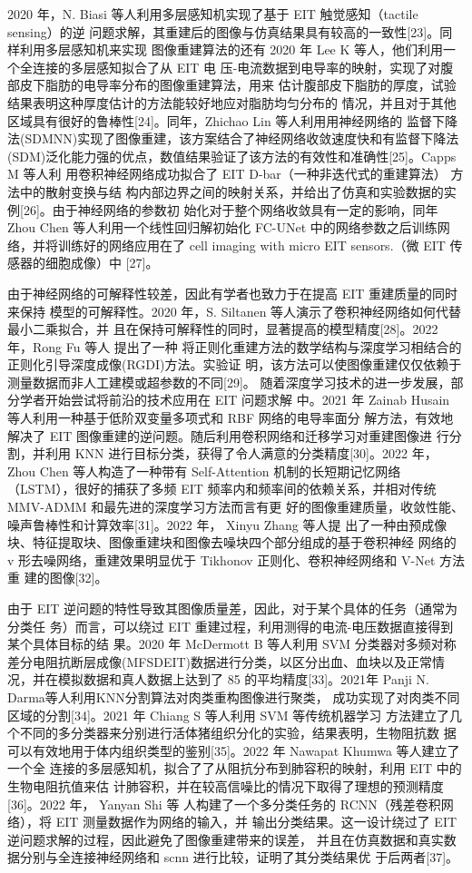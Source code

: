 2020 年，N. Biasi 等人利用多层感知机实现了基于 EIT 触觉感知（tactile sensing）的逆
问题求解，其重建后的图像与仿真结果具有较高的一致性[23]。同样利用多层感知机来实现
图像重建算法的还有 2020 年 Lee K 等人，他们利用一个全连接的多层感知拟合了从 EIT 电
压-电流数据到电导率的映射，实现了对腹部皮下脂肪的电导率分布的图像重建算法，用来
估计腹部皮下脂肪的厚度，试验结果表明这种厚度估计的方法能较好地应对脂肪均匀分布的
情况，并且对于其他区域具有很好的鲁棒性[24]。同年，Zhichao Lin 等人利用用神经网络的
监督下降法(SDMNN)实现了图像重建，该方案结合了神经网络收敛速度快和有监督下降法
(SDM)泛化能力强的优点，数值结果验证了该方法的有效性和准确性[25]。Capps M 等人利
用卷积神经网络成功拟合了 EIT D-bar（一种非迭代式的重建算法） 方法中的散射变换与结
构内部边界之间的映射关系，并给出了仿真和实验数据的实例[26]。由于神经网络的参数初
始化对于整个网络收敛具有一定的影响，同年 Zhou Chen 等人利用一个线性回归解初始化
FC-UNet 中的网络参数之后训练网络，并将训练好的网络应用在了 cell imaging with micro
EIT sensors.（微 EIT 传感器的细胞成像）中 [27]。

由于神经网络的可解释性较差，因此有学者也致力于在提高 EIT 重建质量的同时来保持
模型的可解释性。2020 年，S. Siltanen 等人演示了卷积神经网络如何代替最小二乘拟合，并
且在保持可解释性的同时，显著提高的模型精度[28]。2022 年，Rong Fu 等人 提出了一种
将正则化重建方法的数学结构与深度学习相结合的正则化引导深度成像(RGDI)方法。实验证
明，该方法可以使图像重建仅仅依赖于测量数据而非人工建模或超参数的不同[29]。
随着深度学习技术的进一步发展，部分学者开始尝试将前沿的技术应用在 EIT 问题求解
中。2021 年 Zainab Husain 等人利用一种基于低阶双变量多项式和 RBF 网络的电导率面分
解方法，有效地解决了 EIT 图像重建的逆问题。随后利用卷积网络和迁移学习对重建图像进
行分割，并利用 KNN 进行目标分类，获得了令人满意的分类精度[30]。2022 年，Zhou Chen
等人构造了一种带有 Self-Attention 机制的长短期记忆网络（LSTM），很好的捕获了多频 EIT
频率内和频率间的依赖关系，并相对传统 MMV-ADMM 和最先进的深度学习方法而言有更
好的图像重建质量，收敛性能、噪声鲁棒性和计算效率[31]。2022 年， Xinyu Zhang 等人提
出了一种由预成像块、特征提取块、图像重建块和图像去噪块四个部分组成的基于卷积神经
网络的 v 形去噪网络，重建效果明显优于 Tikhonov 正则化、卷积神经网络和 V-Net 方法重
建的图像[32]。

由于 EIT 逆问题的特性导致其图像质量差，因此，对于某个具体的任务（通常为分类任
务）而言，可以绕过 EIT 重建过程，利用测得的电流-电压数据直接得到某个具体目标的结
果。2020 年 McDermott B 等人利用 SVM 分类器对多频对称差分电阻抗断层成像(MFSDEIT)数据进行分类，以区分出血、血块以及正常情况，并在模拟数据和真人数据上达到了 85%
的平均精度[33]。2021年 Panji N. Darma等人利用KNN分割算法对肉类重构图像进行聚类，
成功实现了对肉类不同区域的分割[34]。2021 年 Chiang S 等人利用 SVM 等传统机器学习
方法建立了几个不同的多分类器来分别进行活体猪组织分化的实验，结果表明，生物阻抗数
据可以有效地用于体内组织类型的鉴别[35]。2022 年 Nawapat Khumwa 等人建立了一个全
连接的多层感知机，拟合了了从阻抗分布到肺容积的映射，利用 EIT 中的生物电阻抗值来估
计肺容积，并在较高信噪比的情况下取得了理想的预测精度[36]。2022 年， Yanyan Shi 等
人构建了一个多分类任务的 RCNN（残差卷积网络），将 EIT 测量数据作为网络的输入，并
输出分类结果。这一设计绕过了 EIT 逆问题求解的过程，因此避免了图像重建带来的误差，
并且在仿真数据和真实数据分别与全连接神经网络和 scnn 进行比较，证明了其分类结果优
于后两者[37]。

